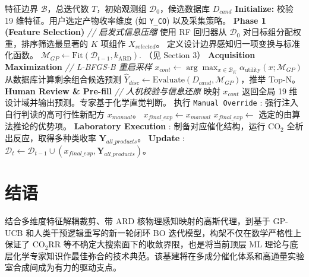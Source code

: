 \documentclass[12pt,a4paper]{article}
\begin{document}
\begin{algorithm}[H]
\caption{CO$_2$RR Human-in-the-Loop 贝叶斯优化执行流}
\label{alg:hitl-bo}
\begin{algorithmic}[1]
\REQUIRE 特征边界 $\mathcal{B}$，总迭代数 $T$，初始观测组 $\mathcal{D}_0$，候选数据库 $D_{cand}$
\STATE \textbf{Initialize:} 校验 19 维特征。用户选定产物收率维度 (如 \texttt{Y\_CO}) 以及采集策略。
\STATE \textbf{Phase 1 (Feature Selection)} \textit{// 启发式信息压缩}
\STATE 使用 RF 回归器从 $\mathcal{D}_0$ 对目标组分配权重，排序筛选最显著的 $K$ 项组作 $X_{selected}$。
    \STATE 定义设计边界感知归一项变换与标准化函数。
    \STATE $\mathcal{M}_{GP} \leftarrow \text{Fit}(\mathcal{D}_{t-1}, k_{\text{ARD}})$. （见 Section 3）
    \STATE \textbf{Acquisition Maximization} \textit{// L-BFGS-B 重启采样}
    \STATE $x_{cont} \leftarrow \arg\max_{x \in \mathcal{B}_{K}} \alpha_{\text{utility}}(x; \mathcal{M}_{GP})$
    \STATE 从数据库计算剩余组合候选预测 $\hat{Y}_{disc} \leftarrow \text{Evaluate}(D_{cand}, \mathcal{M}_{GP})$，推举 Top-N。
    \STATE \textbf{Human Review \& Pre-fill} \textit{// 人机校验与信息还原}
    \STATE 映射 $x_{cont}$ 返回全局 19 维设计域并输出预测。专家基于化学直觉判断。
        \STATE 执行 \texttt{Manual Override} : 强行注入自行判读的高可行性新配方 $x_{manual}$。
        \STATE $x_{final\_exp} \leftarrow x_{manual}$
    \ELSE
        \STATE $x_{final\_exp} \leftarrow$ 选定的由算法推论的优势项。
    \ENDIF
    \STATE \textbf{Laboratory Execution} : 制备对应催化结构，运行 CO$_2$ 全析出反应，取得多种类收率 $\mathbf{Y}_{all\_products}$。
    \STATE \textbf{Update} : $\mathcal{D}_t \leftarrow \mathcal{D}_{t-1} \cup (x_{final\_exp}, \mathbf{Y}_{all\_products})$。
\ENDFOR
\end{algorithmic}
\end{algorithm}



\section{结语}
结合多维度特征解耦裁剪、带 ARD 核物理感知映射的高斯代理，到基于 GP-UCB 和人类干预逻辑重写的新一轮闭环 BO 迭代模型，构架不仅在数学严格性上保证了 CO$_2$RR 等不确定大搜索面下的收敛界限，也是将当前顶层 ML 理论与底层化学专家知识作最佳弥合的技术典范。该基建将在多成分催化体系和高通量实验室合成间成为有力的驱动支点。
\end{document}
